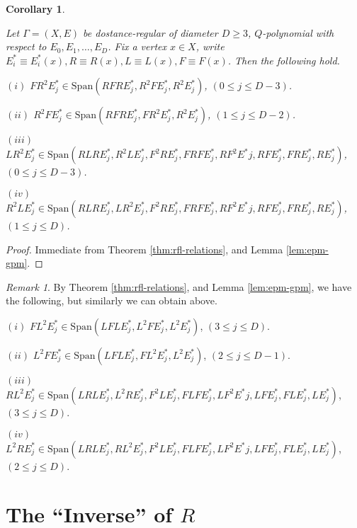 \documentclass[
]{book}
\newtheorem{corollary}{Corollary}[chapter]
\theoremstyle{definition}
\theoremstyle{definition}
\theoremstyle{definition}
\theoremstyle{definition}
\theoremstyle{remark}
\newtheorem*{remark}{Remark}
\begin{document}
\begin{corollary}
\protect\hypertarget{cor:fr2lr2r2l}{}\label{cor:fr2lr2r2l}

Let \(\Gamma = (X, E)\) be dostance-regular of diameter \(D\geq 3\), \(Q\)-polynomial with respect to \(E_0, E_1, \ldots, E_D\). Fix a vertex \(x\in X\), write \(E^*_i \equiv E^*_i(x), R\equiv R(x), L\equiv L(x), F\equiv F(x)\).
Then the following hold.

\((i)\) \(FR^2E^*_j \in \mathrm{Span}(RFRE^*_j, R^2FE^*_j, R^2E^*_j)\), \((0\leq j\leq D-3)\).

\((ii)\) \(R^2FE^*_j \in \mathrm{Span}(RFRE^*_j, FR^2E^*_j, R^2E^*_j)\), \((1\leq j\leq D-2)\).

\((iii)\) \(LR^2E^*_j \in \mathrm{Span}(RLRE^*_j, R^2LE^*_j, F^2RE^*_j, FRFE^*_j, RF^2E^*j, RFE^*_j, FRE^*_j, RE^*_j)\), \((0\leq j\leq D-3)\).

\((iv)\) \(R^2LE^*_j \in \mathrm{Span}(RLRE^*_j, LR^2E^*_j, F^2RE^*_j, FRFE^*_j, RF^2E^*j, RFE^*_j, FRE^*_j, RE^*_j)\), \((1\leq j\leq D)\).

\end{corollary}

\begin{proof}
Immediate from Theorem \ref{thm:rfl-relations}, and Lemma \ref{lem:epm-gpm}.
\end{proof}

\begin{remark}

By Theorem \ref{thm:rfl-relations}, and Lemma \ref{lem:epm-gpm}, we have the following, but similarly we can obtain above.

\((i)\) \(FL^2E^*_j \in \mathrm{Span}(LFLE^*_j, L^2FE^*_j, L^2E^*_j)\), \((3\leq j\leq D)\).

\((ii)\) \(L^2FE^*_j \in \mathrm{Span}(LFLE^*_j, FL^2E^*_j, L^2E^*_j)\), \((2\leq j\leq D-1)\).

\((iii)\) \(RL^2E^*_j \in \mathrm{Span}(LRLE^*_j, L^2RE^*_j, F^2LE^*_j, FLFE^*_j, LF^2E^*j, LFE^*_j, FLE^*_j, LE^*_j)\), \((3\leq j\leq D)\).

\((iv)\) \(L^2RE^*_j \in \mathrm{Span}(LRLE^*_j, RL^2E^*_j, F^2LE^*_j, FLFE^*_j, LF^2E^*j, LFE^*_j, FLE^*_j, LE^*_j)\), \((2\leq j\leq D)\).

\end{remark}

\hypertarget{lec31}{%
\chapter{\texorpdfstring{The ``Inverse'' of \(R\)}{The ``Inverse'' of R}}\label{lec31}}
\end{document}

